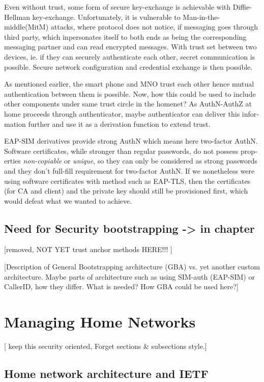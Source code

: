 \documentclass[12pt,a4paper,english]{tutthesis}
\begin{document}
\begin{otherlanguage}{english}
Even without trust, some form of secure key-exchange is achievable
with Diffie-Hellman key-exchange\cite{diffie1976new}. Unfortunately, it is vulnerable
to Man-in-the-middle(MitM) attacks, where protocol does not notice, 
if messaging goes through third party, which inpersonates itself to 
both ends as being the corresponding messaging partner and can
read encrypted messages.
With trust set between two devices, ie. if they can securely
authenticate each other, secret communication is possible. 
Secure network configuration and credential exchange is then possible.


As mentioned earlier, the smart phone and MNO trust each other hence
mutual authentication between them is possible.  Now, how this could be used
to include other components under same trust circle in the homenet? 
As AuthN-AuthZ at home proceeds through authenticator, maybe
authenticator  can deliver this information further and use it as a
 derivation function to extend trust.

EAP-SIM derivatives provide strong AuthN which means here two-factor
AuthN. Software certificates, while stronger than regular passwords,
do not possess properties \emph{non-copiable} or \emph{unique}, so they can only
be considered as strong passwords and they don't full-fill 
requirement for two-factor AuthN.
If we nonetheless were using software certificates with method such as
EAP-TLS, then the certificates (for CA and client) and the private key
should still be provisioned first, which would defeat what we wanted
to achieve.


\section{Need for Security bootstrapping -> in chapter}
\label{sec-2-7}
[removed, NOT YET trust anchor methods HERE!!! ]



[Description of General Bootstrapping architecture (GBA) vs. yet
another custom architecture. Maybe parts of architecture
such as using SIM-auth (EAP-SIM) or CallerID, how they differ. 
What is needed? How GBA could be used here?]
\chapter{Managing Home Networks}
\label{sec-3}
[ keep this security oriented, Forget sections \& subsections style.]

\section{Home network architecture and IETF}
\label{sec-3-1}



\end{otherlanguage}
\end{document}
